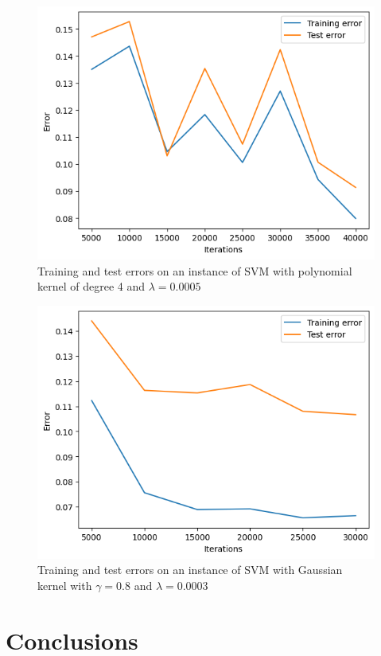 \documentclass{article}
\begin{document}
\begin{figure}
	\centering
	\includegraphics[width=0.5\columnwidth]{../plots/kpoly_svm.png}
	\caption{Training and test errors on an instance of SVM with polynomial kernel of degree 4 and $\lambda=0.0005$}
	\label{fig:kpoly_svm.png}
\end{figure}
\begin{figure}
	\centering
	\includegraphics[width=0.5\columnwidth]{../plots/kgauss_svm.png}
	\caption{Training and test errors on an instance of SVM with Gaussian kernel with $\gamma=0.8$ and $\lambda=0.0003$}
	\label{fig:kgauss_svm.png}
\end{figure}

\section{Conclusions}
\end{document}

